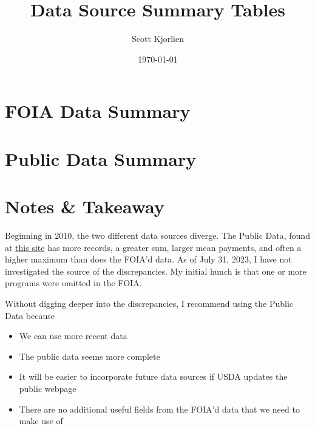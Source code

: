\documentclass{article}
\title{Data Source Summary Tables}
\author{Scott Kjorlien}
\date{\today}
\begin{document}
\maketitle

\section*{FOIA Data Summary}


\newpage
\section*{Public Data Summary}


\section*{Notes \& Takeaway}
Beginning in 2010, the two different data sources diverge. The Public Data, found at 
\href{https://www.fsa.usda.gov/news-room/efoia/electronic-reading-room/frequently-requested-information/payment-files-information/index}{this site}
has more records, a greater sum, larger mean payments, and often a higher maximum than does the 
FOIA'd data. As of July 31, 2023, I have not investigated the source of the discrepancies. My initial hunch  
is that one or more programs were omitted in the FOIA. 

Without digging deeper into the discrepancies, I recommend using the Public Data because 
\begin{itemize}
    \item We can use more recent data 
    \item The public data seems more complete 
    \item It will be easier to incorporate future data sources if USDA updates the public webpage
    \item There are no additional useful fields from the FOIA'd data that we need to make use of
\end{itemize}
\end{document}
